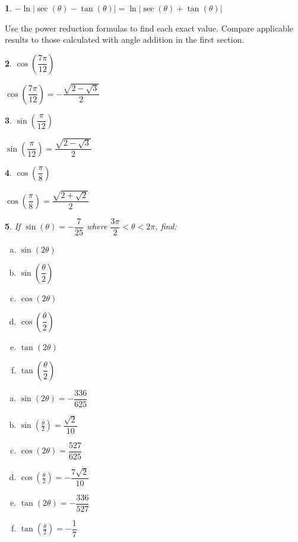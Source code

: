 \documentclass{amsbook}
\newcommand{\ssp}{\begin{enumerate}[(a), leftmargin=*]}
\newcommand{\esp}{\end{enumerate}}
\newtheorem{exc}{}
\newenvironment{ex}{\begin{exc}\normalfont}{\end{exc}}
\numberwithin{section}{chapter}
\numberwithin{equation}{chapter}
\begin{document}
\begin{ex}
	 $-\ln|\sec(\theta) - \tan(\theta)| = \ln|\sec(\theta)+\tan(\theta)|$
\end{ex}



\bigskip
Use the power reduction formulas to find each exact value. Compare applicable results to those calculated with angle addition in the first section.

\begin{multicols}{3}

\begin{ex}
	$\cos\left( \dfrac{7\pi}{12} \right)$
	\begin{sol}
		$\cos\left( \dfrac{7\pi}{12} \right) = -\dfrac{\sqrt{2-\sqrt{3}}}{2}$  
	\end{sol}
\end{ex}


\begin{ex}
		$\sin\left( \dfrac{\pi}{12} \right)$
	\begin{sol}
		$\sin\left( \dfrac{\pi}{12} \right) = \dfrac{\sqrt{2-\sqrt{3}}}{2}$ 
	\end{sol}
\end{ex}



\begin{ex}
	 $\cos \left( \dfrac{\pi}{8} \right)$
	\begin{sol}
		 $\cos \left( \dfrac{\pi}{8} \right) = \dfrac{\sqrt{2 + \sqrt{2}}}{2}$
	\end{sol}
\end{ex}

\end{multicols}

\begin{ex}
	If  $\sin(\theta) = -\dfrac{7}{25}$ where $\dfrac{3\pi}{2} < \theta < 2\pi$, find:
	\begin{multicols}{3}
	\ssp
	\item $\sin(2\theta)$
	\item $\sin\left(\dfrac{\theta}{2}\right)$
	\item $\cos(2\theta)$
	\item $\cos\left(\dfrac{\theta}{2}\right)$
	\item $\tan(2\theta)$
	\item $\tan\left(\dfrac{\theta}{2}\right)$
	\esp
	\end{multicols}
	\begin{sol}
		\ssp
		\item $\sin(2\theta) = -\dfrac{336}{625}$
		\item $\sin\left(\frac{\theta}{2}\right) = \dfrac{\sqrt{2}}{10}$
		\item $\cos(2\theta) = \dfrac{527}{625}$
		\item $\cos\left(\frac{\theta}{2}\right) = -\dfrac{7\sqrt{2}}{10}$
		\item $\tan(2\theta) = -\dfrac{336}{527}$
		\item $\tan\left(\frac{\theta}{2}\right) = -\dfrac{1}{7}$
		\esp
	\end{sol}
\end{ex}
\end{document}
